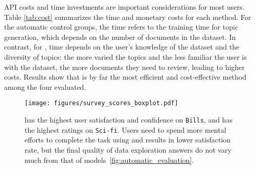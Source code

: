 \mm{} API costs and time investments are important considerations for most users. Table \ref{tab:cost} summarizes the time and monetary costs for each method. For the automatic control groups, the time refers to the training time for topic generation, which depends on the number of documents in the dataset. In contrast, for \bass{}, time depends on the user's knowledge of the dataset and the diversity of topics: the more varied the topics and the less familiar the user is with the dataset, the more documents they need to review, leading to higher costs. Results show that \lda{} is by far the most efficient and cost-effective method among the four evaluated.


\begin{figure}[t]
    \centering
    \texttt{[image: figures/survey\_scores\_boxplot.pdf]}
    \caption{\bass{} has the highest user satisfaction and confidence on \texttt{Bills}, and \lloom{} has the highest ratings on \texttt{Sci-fi}. Users need to spend more mental efforts to complete the task using  and results in lower satisfaction rate, but the final quality of data exploration answers do not vary much from that of \mm{} models~\ref{fig:automatic_evaluation}.}
    \label{fig:survey_ratings}
\end{figure}


